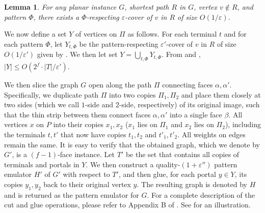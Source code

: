 \documentclass[11pt]{article}
\newtheorem{lemma}[theorem]{Lemma}
\theoremstyle{definition}
\newcommand{\eps}{{\varepsilon}}
\newcounter{note}
\begin{document}
\begin{lemma}
\label{lem: pattern cover}
For any planar instance $G$, shortest path $R$ in $G$, vertex $v\notin R$, and pattern $\Phi$, there exists a $\Phi$-respecting $\eps$-cover of $v$ in $R$ of size $O(1/\eps)$.
\end{lemma}


We now define a set $Y$ of vertices on $\Pi$ as follows. For each terminal $t$ and for each pattern $\Phi$, let $Y_{t,\Phi}$ be the pattern-respecting $\eps'$-cover of $v$ in $R$ of size $O(1/\eps')$ given by . We then let set $Y=\bigcup_{t,\Phi}Y_{t,\Phi}$.
From  and , 
$|Y|\le O(2^f\cdot |T|/\eps')$.





We then slice the graph $G$ open along the path $\Pi$ connecting faces $\alpha,\alpha'$.
Specifically, we duplicate path $\Pi$ into two copies $\Pi_1,\Pi_2$ and place them closely at two sides (which we call $1$-side and $2$-side, respectively) of its original image, such that the thin strip between them connect faces $\alpha,\alpha'$ into a single face $\beta$.
All vertices $x$ on $P$ into their copies $x_1,x_2$ ($x_1$ lies on $\Pi_1$ and $x_2$ lies on $\Pi_2$), including the terminals $t,t'$ that now have copies $t_1,t_2$ and $t'_1,t'_2$. All weights on edges remain the same. 
It is easy to verify that the obtained graph, which we denote by $G'$, is a $(f-1)$-face instance.
Let $T'$ be the set that contains all copies of terminals and portals in $Y$.
We then construct a quality-$(1+\eps'')$ pattern emulator $H'$ of $G'$ with respect to $T'$, and then glue, for each portal $y\in Y$, its copies $y_1,y_2$ back to their original vertex $y$. The resulting graph is denoted by $H$ and is returned as the pattern emulator for $G$.
For a complete description of the cut and glue operations, please refer to Appendix B of \cite{chang2022near}.
See  for an illustration.
\end{document}

